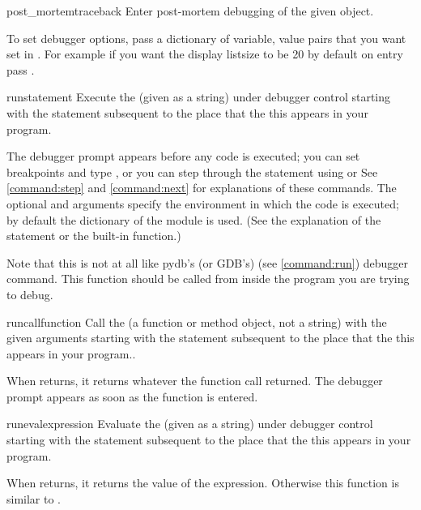 \begin{funcdesc}{post_mortem}{traceback}\label{post-mortem}
Enter post-mortem debugging of the given  object.

To set debugger options, pass a dictionary of variable, value pairs
that you want set in . For example if you want
the display listsize to be 20 by default on entry pass
.

\end{funcdesc}

\begin{funcdesc}{run}{statement}
Execute the  (given as a string) under debugger
control starting with the statement subsequent to the place that the
this appears in your program.

The debugger prompt appears before any code is executed; you can set
breakpoints and type , or you can step through the
statement using  or  See \ref{command:step} and
\ref{command:next} for explanations of these commands.  The optional
 and  arguments specify the environment in
which the code is executed; by default the dictionary of the module
 is used.  (See the explanation of the
 statement or the  built-in function.)

Note that this is not at all like pydb's (or GDB's)  (see
\ref{command:run}) debugger command. This function should be called
from inside the program you are trying to debug.
\end{funcdesc}

\begin{funcdesc}{runcall}{function}
Call the  (a function or method object, not a string)
with the given arguments starting with the statement subsequent to the
place that the this appears in your program..

When  returns, it returns
whatever the function call returned.  The debugger prompt appears as
soon as the function is entered.
\end{funcdesc}

\begin{funcdesc}{runeval}{expression}
Evaluate the  (given as a string) under debugger
control starting with the statement subsequent to the place that the
this appears in your program.

When  returns, it returns the value of the
expression.  Otherwise this function is similar to
.
\end{funcdesc}

